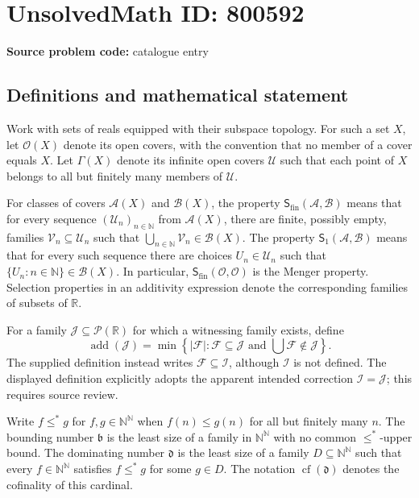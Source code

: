 \documentclass[11pt]{article}
\newcommand{\N}{\mathbb{N}}
\newcommand{\R}{\mathbb{R}}
\begin{document}
\section*{UnsolvedMath ID: 800592}
\textbf{Source problem code:} catalogue entry
\subsection{Definitions and mathematical statement}
Work with sets of reals equipped with their subspace topology. For such a set \(X\), let \(\mathcal O(X)\) denote its open covers, with the convention that no member of a cover equals \(X\). Let \(\Gamma(X)\) denote its infinite open covers \(\mathcal U\) such that each point of \(X\) belongs to all but finitely many members of \(\mathcal U\).

For classes of covers \(\mathcal A(X)\) and \(\mathcal B(X)\), the property \(\mathsf S_{\mathrm{fin}}(\mathcal A,\mathcal B)\) means that for every sequence \((\mathcal U_n)_{n\in\N}\) from \(\mathcal A(X)\), there are finite, possibly empty, families \(\mathcal V_n\subseteq\mathcal U_n\) such that \(\bigcup_{n\in\N}\mathcal V_n\in\mathcal B(X)\). The property \(\mathsf S_1(\mathcal A,\mathcal B)\) means that for every such sequence there are choices \(U_n\in\mathcal U_n\) such that \(\{U_n:n\in\N\}\in\mathcal B(X)\). In particular, \(\mathsf S_{\mathrm{fin}}(\mathcal O,\mathcal O)\) is the Menger property. Selection properties in an additivity expression denote the corresponding families of subsets of \(\R\).

For a family \(\mathcal J\subseteq\mathcal P(\R)\) for which a witnessing family exists, define
\[
\operatorname{add}(\mathcal J)=\min\left\{|\mathcal F|:\mathcal F\subseteq\mathcal J\text{ and }\bigcup\mathcal F\notin\mathcal J\right\}.
\]
The supplied definition instead writes \(\mathcal F\subseteq\mathcal I\), although \(\mathcal I\) is not defined. The displayed definition explicitly adopts the apparent intended correction \(\mathcal I=\mathcal J\); this requires source review.

Write \(f\leq^*g\) for \(f,g\in\N^{\N}\) when \(f(n)\leq g(n)\) for all but finitely many \(n\). The bounding number \(\mathfrak b\) is the least size of a family in \(\N^{\N}\) with no common \(\leq^*\)-upper bound. The dominating number \(\mathfrak d\) is the least size of a family \(D\subseteq\N^{\N}\) such that every \(f\in\N^{\N}\) satisfies \(f\leq^*g\) for some \(g\in D\). The notation \(\operatorname{cf}(\mathfrak d)\) denotes the cofinality of this cardinal.
\end{document}

